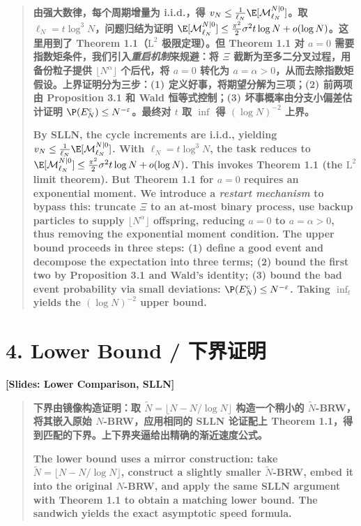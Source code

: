 \documentclass[12pt,a4paper]{article}
\begin{document}
\begin{quote}
\textbf{由强大数律，每个周期增量为 i.i.d.，得 $v_N\le\frac{1}{\ell_N}\E[\mathcal M_{\ell_N}^{N|0}]$。取 $\ell_N=t\log^3 N$，问题归结为证明 $\E[\mathcal M_{\ell_N}^{N|0}]\le\frac{\pi^2}{2}\sigma^2 t\log N+o(\log N)$。这里用到了 Theorem 1.1（$\mathrm{L}^2$ 极限定理）。但 Theorem 1.1 对 $a=0$ 需要指数矩条件，我们引入\emph{重启机制}来规避：将 $\Xi$ 截断为至多二分叉过程，用备份粒子提供 $\lfloor N^\alpha\rfloor$ 个后代，将 $a=0$ 转化为 $a=\alpha>0$，从而去除指数矩假设。上界证明分为三步：(1) 定义好事，将期望分解为三项；(2) 前两项由 Proposition 3.1 和 Wald 恒等式控制；(3) 坏事概率由分支小偏差估计证明 $\P(E_N^{\mathrm{c}})\le N^{-\varepsilon}$。最终对 $t$ 取 $\inf$ 得 $(\log N)^{-2}$ 上界。}

\bigskip

\textbf{By SLLN, the cycle increments are i.i.d., yielding $v_N\le\frac{1}{\ell_N}\E[\mathcal M_{\ell_N}^{N|0}]$. With $\ell_N=t\log^3 N$, the task reduces to $\E[\mathcal M_{\ell_N}^{N|0}]\le\frac{\pi^2}{2}\sigma^2 t\log N+o(\log N)$. This invokes Theorem 1.1 (the $\mathrm{L}^2$ limit theorem). But Theorem 1.1 for $a=0$ requires an exponential moment. We introduce a \emph{restart mechanism} to bypass this: truncate $\Xi$ to an at-most binary process, use backup particles to supply $\lfloor N^\alpha\rfloor$ offspring, reducing $a=0$ to $a=\alpha>0$, thus removing the exponential moment condition. The upper bound proceeds in three steps: (1) define a good event and decompose the expectation into three terms; (2) bound the first two by Proposition 3.1 and Wald's identity; (3) bound the bad event probability via small deviations: $\P(E_N^{\mathrm{c}})\le N^{-\varepsilon}$. Taking $\inf_t$ yields the $(\log N)^{-2}$ upper bound.}
\end{quote}

\section*{4. Lower Bound / 下界证明}

\begin{center}
\color{blue!60!black}\textbf{[Slides: Lower Comparison, SLLN]}
\end{center}

\begin{quote}
\textbf{下界由镜像构造证明：取 $\widetilde N = \lfloor N - N/\log N\rfloor$ 构造一个稍小的 $\widetilde N$-BRW，将其嵌入原始 $N$-BRW，应用相同的 SLLN 论证配上 Theorem 1.1，得到匹配的下界。上下界夹逼给出精确的渐近速度公式。}

\bigskip

\textbf{The lower bound uses a mirror construction: take $\widetilde N = \lfloor N - N/\log N\rfloor$, construct a slightly smaller $\widetilde N$-BRW, embed it into the original $N$-BRW, and apply the same SLLN argument with Theorem 1.1 to obtain a matching lower bound. The sandwich yields the exact asymptotic speed formula.}
\end{quote}
\end{document}
